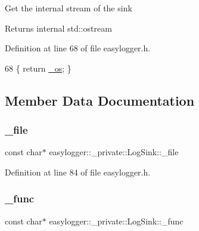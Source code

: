Get the internal stream of the sink

\begin{DoxyReturn}{Returns}
internal std\+::ostream 
\end{DoxyReturn}


Definition at line 68 of file easylogger.\+h.


\begin{DoxyCode}
68 \{ \textcolor{keywordflow}{return} \mbox{\hyperlink{classeasylogger_1_1__private_1_1_log_sink_aa75fd29fc9b5f119faf3cf98972c7992}{\_os}}; \}
\end{DoxyCode}


\subsection{Member Data Documentation}
\mbox{\label{classeasylogger_1_1__private_1_1_log_sink_a9496a68363124d15396253627d2702bb}} 
\subsubsection{\texorpdfstring{\+\_\+file}{\_file}}
{\footnotesize\ttfamily const char$\ast$ easylogger\+::\+\_\+private\+::\+Log\+Sink\+::\+\_\+file\hspace{0.3cm}{\ttfamily [private]}}



Definition at line 84 of file easylogger.\+h.

\mbox{\label{classeasylogger_1_1__private_1_1_log_sink_a147321aae0346917642528aa81aedf32}} 
\subsubsection{\texorpdfstring{\+\_\+func}{\_func}}
{\footnotesize\ttfamily const char$\ast$ easylogger\+::\+\_\+private\+::\+Log\+Sink\+::\+\_\+func\hspace{0.3cm}{\ttfamily [private]}}



